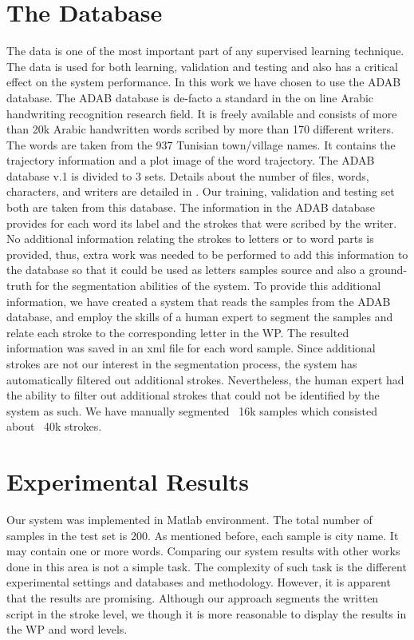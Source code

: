 \documentclass[journal,compsoc]{IEEEtran}
\begin{document}
\section{The Database}
\label{sec:database}
The data is one of the most important part of any supervised learning technique. The data is used for both learning, validation and testing  and also has a critical effect on the system performance. In this work we have chosen to use the ADAB database. The ADAB database is de-facto a standard in the on line Arabic handwriting recognition research field. It is freely available and consists of more than 20k Arabic handwritten words scribed by more than 170 different writers. The words are taken from the 937 Tunisian town/village names. It contains the trajectory information and a plot image of the word trajectory. The ADAB database v.1 is divided to 3 sets. Details about the number of files, words, characters, and writers are detailed in \cite{el2009icdar}. Our training, validation and testing set both are taken from this database. 
The information in the ADAB database provides for each word its label and the strokes that were scribed by the writer. No additional information relating the strokes to letters or to word parts is provided, thus, extra work was needed to be performed to add this information to the database so that it could be used as letters samples source and also a ground-truth for the segmentation abilities of the system. To provide this additional information, we have created a system that reads the samples from the ADAB database, and employ the skills of a human expert to segment the samples and relate each stroke to the corresponding letter in the WP. The resulted information was saved in an xml file for each word sample. Since additional strokes are not our interest in the segmentation process, the system has automatically filtered out additional strokes. Nevertheless, the human expert had the ability to filter out additional strokes that could not be identified by the system as such. We have manually segmented ~16k samples which consisted about ~40k strokes.

\section{Experimental Results}
\label{sec:results}
Our system was implemented in Matlab environment. The total number of samples in the test set is 200. As mentioned before, each sample is city name. It may contain one or more words. Comparing our system results with other works done in this area is not a simple task. The complexity of such task is the different experimental settings and databases and methodology. However, it is apparent that the results are promising. Although our approach segments the written script in the stroke level, we though it is more reasonable to display the results in the WP and word levels. 
\end{document}
